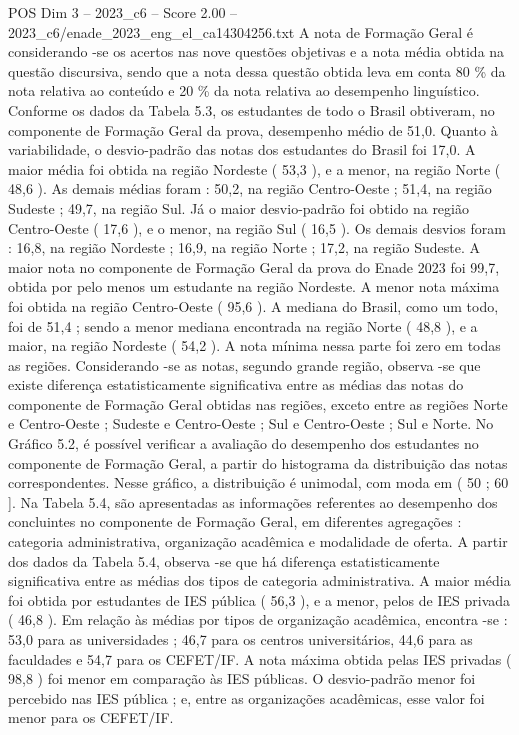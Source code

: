 \begin{textsample}{POS Dim 3 – 2023\_c6 – Score 2.00 – 2023\_c6/enade\_2023\_eng\_el\_ca14304256.txt}
A nota de Formação Geral é considerando -se os acertos nas nove questões objetivas e a nota média obtida na questão discursiva, sendo que a nota dessa questão obtida leva em conta 80 \% da nota relativa ao conteúdo e 20 \% da nota relativa ao desempenho linguístico.
Conforme os dados da Tabela 5.3, os estudantes de todo o Brasil obtiveram, no componente de Formação Geral da prova, desempenho médio de 51,0.
Quanto à variabilidade, o desvio-padrão das notas dos estudantes do Brasil foi 17,0.
A maior média foi obtida na região Nordeste ( 53,3 ), e a menor, na região Norte ( 48,6 ).
As demais médias foram : 50,2, na região Centro-Oeste ; 51,4, na região Sudeste ; 49,7, na região Sul.
Já o maior desvio-padrão foi obtido na região Centro-Oeste ( 17,6 ), e o menor, na região Sul ( 16,5 ).
Os demais desvios foram : 16,8, na região Nordeste ; 16,9, na região Norte ; 17,2, na região Sudeste.
A maior nota no componente de Formação Geral da prova do Enade 2023 foi 99,7, obtida por pelo menos um estudante na região Nordeste.
A menor nota máxima foi obtida na região Centro-Oeste ( 95,6 ).
A mediana do Brasil, como um todo, foi de 51,4 ; sendo a menor mediana encontrada na região Norte ( 48,8 ), e a maior, na região Nordeste ( 54,2 ).
A nota mínima nessa parte foi zero em todas as regiões.
Considerando -se as notas, segundo grande região, observa -se que existe diferença estatisticamente significativa entre as médias das notas do componente de Formação Geral obtidas nas regiões, exceto entre as regiões Norte e Centro-Oeste ; Sudeste e Centro-Oeste ; Sul e Centro-Oeste ; Sul e Norte.
No Gráfico 5.2, é possível verificar a avaliação do desempenho dos estudantes no componente de Formação Geral, a partir do histograma da distribuição das notas correspondentes.
Nesse gráfico, a distribuição é unimodal, com moda em ( 50 ; 60 ].
Na Tabela 5.4, são apresentadas as informações referentes ao desempenho dos concluintes no componente de Formação Geral, em diferentes agregações : categoria administrativa, organização acadêmica e modalidade de oferta.
A partir dos dados da Tabela 5.4, observa -se que há diferença estatisticamente significativa entre as médias dos tipos de categoria administrativa.
A maior média foi obtida por estudantes de IES pública ( 56,3 ), e a menor, pelos de IES privada ( 46,8 ).
Em relação às médias por tipos de organização acadêmica, encontra -se : 53,0 para as universidades ; 46,7 para os centros universitários, 44,6 para as faculdades e 54,7 para os CEFET/IF.
A nota máxima obtida pelas IES privadas ( 98,8 ) foi menor em comparação às IES públicas.
O desvio-padrão menor foi percebido nas IES pública ; e, entre as organizações acadêmicas, esse valor foi menor para os CEFET/IF.

\end{textsample}
